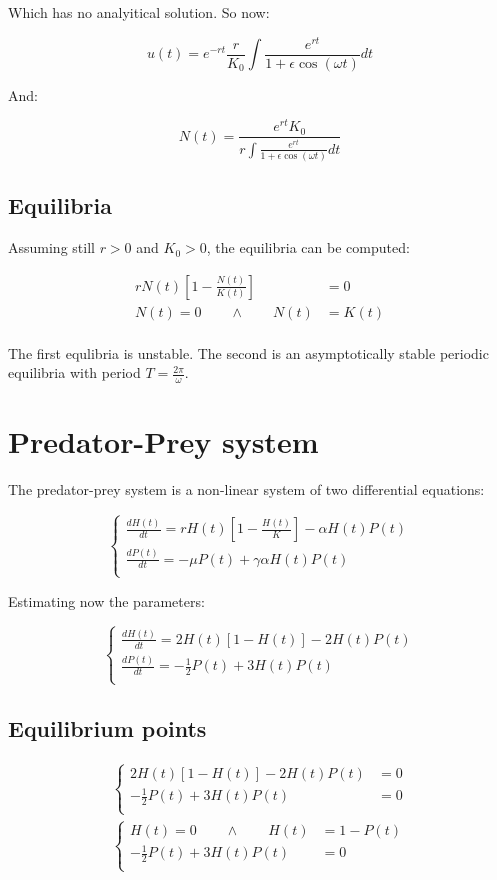   Which has no analyitical solution.
  So now:

  $$u(t) = e^{-rt}\frac{r}{K_0}\int \frac{e^{rt}}{1+\epsilon\cos(\omega t)}dt$$

  And:

  $$N(t) = \frac{e^{rt}K_0}{r\int \frac{e^{rt}}{1+\epsilon\cos(\omega t)}dt}$$

  \subsection{Equilibria}
  Assuming still $r>0$ and $K_0>0$, the equilibria can be computed:

  \begin{align*}
    rN(t)\left[1-\frac{N(t)}{K(t)}\right] &= 0\\
    N(t) = 0\qquad\land\qquad N(t) &= K(t)\\
  \end{align*}

  The first equlibria is unstable.
  The second is an asymptotically stable periodic equilibria with period $T = \frac{2\pi}{\omega}$.

\section{Predator-Prey system}
The predator-prey system is a non-linear system of two differential equations:

$$\begin{cases}
  \frac{dH(t)}{dt} = rH(t)\left[1-\frac{H(t)}{K}\right] - \alpha H(t)P(t)\\
  \frac{dP(t)}{dt} = -\mu P(t) + \gamma\alpha H(t)P(t)\\
\end{cases}$$

Estimating now the parameters:

$$\begin{cases}
  \frac{dH(t)}{dt} = 2H(t)\left[1-H(t)\right] - 2H(t)P(t)\\
  \frac{dP(t)}{dt} = -\frac{1}{2} P(t) + 3H(t)P(t)\\
\end{cases}$$

  \subsection{Equilibrium points}

  \begin{align*}
    \begin{cases}
      2H(t)\left[1-H(t)\right] - 2H(t)P(t) &= 0\\
      -\frac{1}{2} P(t) + 3H(t)P(t) &= 0\\
    \end{cases}\\
    \begin{cases}
      H(t) = 0\qquad\land\qquad H(t) &= 1-P(t)\\
      -\frac{1}{2} P(t) + 3H(t)P(t) &= 0\\
    \end{cases}\\
  \end{align*}

